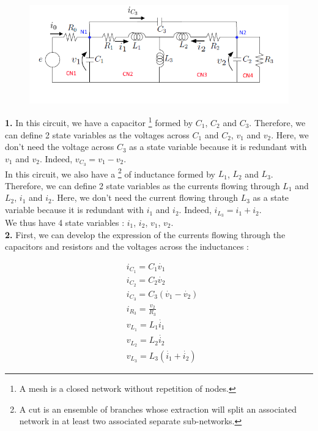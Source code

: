 \begin{figure}[htbp]
\begin{center}
\includegraphics[scale=0.8]{ex33}
\end{center}
\end{figure}

\noindent \textbf{1.}
In this circuit, we have a capacitor \footnote{A mesh is a closed network without repetition of nodes.} formed by $C_1$, $C_2$ and $C_3$. Therefore, we can define 2 state variables as the voltages across $C_1$ and $C_2$, $v_1$ and $v_2$. Here, we don't need the voltage across $C_3$ as a state variable because it is redundant with $v_1$ and $v_2$. Indeed, $v_{C_3} = v_1-v_2$.\\

In this circuit, we also have a \footnote{A cut is an ensemble of branches whose extraction will split an associated network in at least two associated separate sub-networks.} of inductance formed by $L_1$, $L_2$ and $L_3$. Therefore, we can define 2 state variables as the currents flowing through $L_1$ and $L_2$, $i_1$ and $i_2$. Here, we don't need the current flowing through $L_3$ as a state variable because it is redundant with $i_1$ and $i_2$. Indeed, $i_{L_3}=i_1+i_2$.\\

We thus have 4 state variables : $i_1$, $i_2$, $v_1$, $v_2$.\\

\noindent \textbf{2.}
First, we can develop the expression of the currents flowing through the capacitors and resistors and the voltages across the inductances :

\begin{equation}
\begin{split}
&i_{C_1}= C_1 \dot{v_1}\\
&i_{C_2}= C_2 \dot{v_2}\\
&i_{C_3}= C_3 \left( \dot{v_1} - \dot{v_2}\right)\\
&i_{R_3} = \frac{v_2}{R_3}\\
&v_{L_1}= L_1 \dot{i_1}\\
&v_{L_2}= L_2 \dot{i_2}\\
&v_{L_3}= L_3 \left( \dot{i_1} + \dot{i_2} \right)
\end{split} 
\end{equation}

